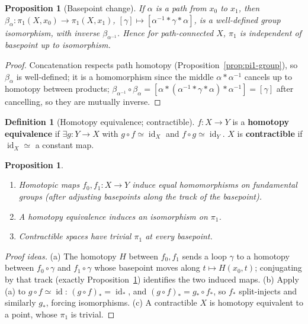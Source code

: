 \documentclass[11pt,a4paper]{article}
\newtheorem{proposition}[theorem]{Proposition}
\theoremstyle{definition}
\newtheorem{definition}[theorem]{Definition}
\newcommand{\id}{\operatorname{id}}
\begin{document}
	\begin{proposition}[Basepoint change]\label{prop:basepoint}
		If $\alpha$ is a path from $x_0$ to $x_1$, then
		$\beta_\alpha:\pi_1(X,x_0)\to\pi_1(X,x_1)$, $[\gamma]\mapsto[\alpha^{-1}*\gamma*\alpha]$, is a well-defined
		group isomorphism, with inverse $\beta_{\alpha^{-1}}$. Hence for path-connected $X$, $\pi_1$ is
		independent of basepoint up to isomorphism.
	\end{proposition}
	\begin{proof}
		Concatenation respects path homotopy (Proposition~\ref{prop:pi1-group}), so $\beta_\alpha$ is
		well-defined; it is a homomorphism since the middle $\alpha*\alpha^{-1}$ cancels up to homotopy
		between products; $\beta_{\alpha^{-1}}\circ\beta_\alpha=[\alpha*(\alpha^{-1}*\gamma*\alpha)*\alpha^{-1}]
		=[\gamma]$ after cancelling, so they are mutually inverse.
	\end{proof}
	
	\begin{definition}[Homotopy equivalence; contractible]
		$f:X\to Y$ is a \textbf{homotopy equivalence} if $\exists g:Y\to X$ with $g\circ f\simeq\id_X$ and
		$f\circ g\simeq\id_Y$. $X$ is \textbf{contractible} if $\id_X\simeq$ a constant map.
	\end{definition}
	
	\begin{proposition}\label{prop:contractible}
		\begin{enumerate}[label=(\alph*)]
			\item Homotopic maps $f_0,f_1:X\to Y$ induce equal homomorphisms on fundamental groups (after
			adjusting basepoints along the track of the basepoint).
			\item A homotopy equivalence induces an isomorphism on $\pi_1$.
			\item Contractible spaces have trivial $\pi_1$ at every basepoint.
		\end{enumerate}
	\end{proposition}
	\begin{proof}[Proof ideas]
		(a) The homotopy $H$ between $f_0,f_1$ sends a loop $\gamma$ to a homotopy between $f_0\circ\gamma$
		and $f_1\circ\gamma$ whose basepoint moves along $t\mapsto H(x_0,t)$; conjugating by that track
		(exactly Proposition~\ref{prop:basepoint}) identifies the two induced maps. (b) Apply (a) to
		$g\circ f\simeq\id$: $(g\circ f)_*=\id_*$, and $(g\circ f)_*=g_*\circ f_*$, so $f_*$ split-injects and
		similarly $g_*$, forcing isomorphisms. (c) A contractible $X$ is homotopy equivalent to a point,
		whose $\pi_1$ is trivial.
	\end{proof}
	
\end{document}
